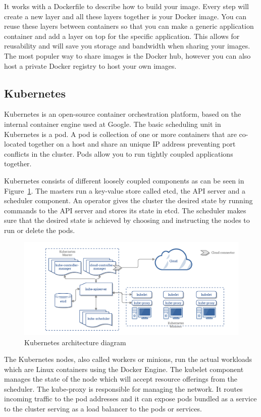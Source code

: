 It works with a Dockerfile to describe how to build your image. Every step will create a new layer and all these layers together is your Docker image. You can reuse these layers between containers so that you can make a generic application container and add a layer on top for the specific application. This allows for reusability and will save you storage and bandwidth when sharing your images. The most populer way to share images is the Docker hub, however you can also host a private Docker registry to host your own images.

\subsection{Kubernetes}
Kubernetes is an open-source container orchestration platform, based on the internal container engine used at Google. The basic scheduling unit in Kubernetes is a pod. A pod is collection of one or more containers that are co-located together on a host and share an unique IP address preventing port conflicts in the cluster. Pods allow you to run tightly coupled applications together.

Kubernetes consists of different loosely coupled components as can be seen in Figure~\ref{fig:k8s-arch}. The masters run a key-value store called etcd\cite{etcd}, the API server and a scheduler component. An operator gives the cluster the desired state by running commands to the API server and stores its state in etcd. The scheduler makes sure that the desired state is achieved by choosing and instructing the nodes to run or delete the pods.

\begin{figure}
    \centering
    \includegraphics[width=1\columnwidth]{images/k8s-arch}
    \caption{Kubernetes architecture diagram\cite{k8s_arch}}
    \label{fig:k8s-arch}
\end{figure}

The Kubernetes nodes, also called workers or minions, run the actual workloads which are Linux containers using the Docker Engine. The kubelet component manages the state of the node which will accept resource offerings from the scheduler. The kube-proxy is responsible for managing the network. It routes incoming traffic to the pod addresses and it can expose pods bundled as a service to the cluster serving as a load balancer to the pods or services. 

